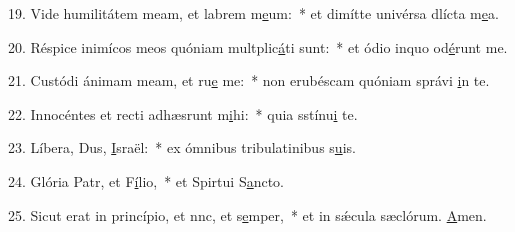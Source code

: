 19. Vide humilitátem meam, et labrem m\uline{e}um:~* et dimítte univérsa dlícta m\uline{e}a.\par 
20. Réspice inimícos meos quóniam multplic\uline{á}ti sunt:~* et ódio inquo od\uline{é}runt me.\par 
21. Custódi ánimam meam, et ru\uline{e} me:~* non erubéscam quóniam správi \uline{i}n te.\par 
22. Innocéntes et recti adhæsrunt m\uline{i}hi:~* quia sstínu\uline{i} te.\par 
23. Líbera, Dus, \uline{I}sraël:~* ex ómnibus tribulatinibus s\uline{u}is.\par 
24. Glória Patr, et F\uline{í}lio,~* et Spirtui S\uline{a}ncto.\par 
25. Sicut erat in princípio, et nnc, et s\uline{e}mper,~* et in sǽcula sæclórum. \uline{A}men.\par 
